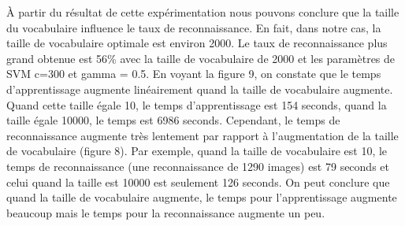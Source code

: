 \documentclass[french,12pt,a4paper,oneside,notitlepage]{report}
\begin{document}
\begin{table}[!ht]
	\begin{center}
	    \caption{La matrice de confusion avec la taille de vocabulaire 10000}
	\end{center}
\end{table}
\pagebreak
À partir du résultat de cette expérimentation nous pouvons conclure que la taille du 
vocabulaire influence le taux de reconnaissance. En fait, dans notre cas, la 
taille de vocabulaire optimale est environ 2000. Le taux de reconnaissance plus grand 
obtenue est 56\% avec la taille de vocabulaire de 2000 et les paramètres de SVM c=300 et 
gamma = 0.5.
En voyant la figure 9, on constate que le temps d'apprentissage augmente linéairement 
quand la taille de vocabulaire augmente. Quand cette taille égale 10, le temps 
d'apprentissage est 154 seconds, quand la taille égale 10000, le temps est 6986 seconds. 
Cependant, le temps de reconnaissance augmente très lentement par rapport à 
l'augmentation de la taille de vocabulaire (figure 8). Par exemple, quand la taille de 
vocabulaire est 10, le temps de reconnaissance (une reconnaissance de 1290 images) est 79 
seconds et celui quand la taille est 10000 est seulement 126 seconds.
On peut conclure que quand la taille de vocabulaire augmente, le temps pour 
l'apprentissage augmente beaucoup mais le temps pour la reconnaissance augmente un peu.
\end{document}
